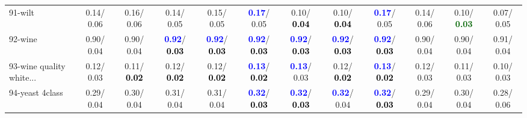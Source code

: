 \begin{table}[h]
\begin{center}
{\begin{tabular}{lc|c|c|c|c|c|c|c|c|c|c}
91-wilt &   0.14/  0.06 &   0.16/  0.06 &   0.14/  0.05 &   0.15/  0.05 & \textcolor{blue}{\textbf{  0.17}}/  0.05 &   0.10/\textcolor{black}{\textbf{  0.04}} &   0.10/\textcolor{black}{\textbf{  0.04}} & \textcolor{blue}{\textbf{  0.17}}/  0.05 &   0.14/  0.06 &   0.10/\textcolor{darkgreen}{\textbf{  0.03}} &   0.07/  0.05 \\
92-wine &   0.90/  0.04 &   0.90/  0.04 & \textcolor{blue}{\textbf{  0.92}}/\textcolor{black}{\textbf{  0.03}} & \textcolor{blue}{\textbf{  0.92}}/\textcolor{black}{\textbf{  0.03}} & \textcolor{blue}{\textbf{  0.92}}/\textcolor{black}{\textbf{  0.03}} & \textcolor{blue}{\textbf{  0.92}}/\textcolor{black}{\textbf{  0.03}} & \textcolor{blue}{\textbf{  0.92}}/\textcolor{black}{\textbf{  0.03}} & \textcolor{blue}{\textbf{  0.92}}/\textcolor{black}{\textbf{  0.03}} &   0.90/  0.04 &   0.90/  0.04 &   0.91/  0.04 \\ \hline
93-wine quality white... &   0.12/  0.03 &   0.11/\textcolor{black}{\textbf{  0.02}} &   0.12/\textcolor{black}{\textbf{  0.02}} &   0.12/\textcolor{black}{\textbf{  0.02}} & \textcolor{blue}{\textbf{  0.13}}/\textcolor{black}{\textbf{  0.02}} & \textcolor{blue}{\textbf{  0.13}}/  0.03 &   0.12/\textcolor{black}{\textbf{  0.02}} & \textcolor{blue}{\textbf{  0.13}}/\textcolor{black}{\textbf{  0.02}} &   0.12/  0.03 &   0.11/  0.03 &   0.10/  0.03 \\
94-yeast 4class &   0.29/  0.04 &   0.30/  0.04 &   0.31/  0.04 &   0.31/  0.04 & \textcolor{blue}{\textbf{  0.32}}/\textcolor{black}{\textbf{  0.03}} & \textcolor{blue}{\textbf{  0.32}}/\textcolor{black}{\textbf{  0.03}} & \textcolor{blue}{\textbf{  0.32}}/  0.04 & \textcolor{blue}{\textbf{  0.32}}/\textcolor{black}{\textbf{  0.03}} &   0.29/  0.04 &   0.30/  0.04 &   0.28/  0.06 \\\end{tabular}
}\label{strats2a5NN}
\end{center}
\end{table}
